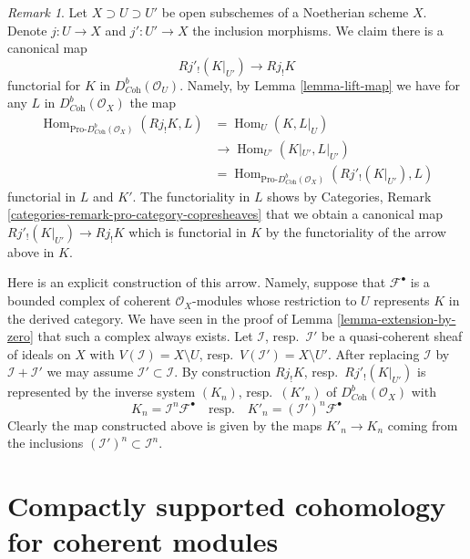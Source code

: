 \documentclass{stacks-project}
\theoremstyle{plain}
\theoremstyle{definition}
\theoremstyle{remark}
\newtheorem{remark}[subsection]{Remark}
\numberwithin{equation}{subsection}
\def\Hom{\mathop{\mathrm{Hom}}\nolimits}
\begin{document}
\begin{remark}
\label{remark-covariance-open-j-lower-shriek}
Let $X \supset U \supset U'$ be open subschemes of a Noetherian scheme $X$.
Denote $j : U \to X$ and $j' : U' \to X$ the inclusion morphisms.
We claim there is a canonical map
$$
Rj'_!(K|_{U'}) \longrightarrow Rj_!K
$$
functorial for $K$ in $D^b_{\textit{Coh}}(\mathcal{O}_U)$. Namely, by
Lemma \ref{lemma-lift-map} we have for any $L$ in
$D^b_{\textit{Coh}}(\mathcal{O}_X)$ the map
\begin{align*}
\Hom_{\text{Pro-}D^b_{\textit{Coh}}(\mathcal{O}_X)}(Rj_!K, L)
& =
\Hom_U(K, L|_U) \\
& \to
\Hom_{U'}(K|_{U'}, L|_{U'}) \\
& =
\Hom_{\text{Pro-}D^b_{\textit{Coh}}(\mathcal{O}_X)}(Rj'_!(K|_{U'}), L)
\end{align*}
functorial in $L$ and $K'$. The functoriality in $L$ shows by
Categories, Remark \ref{categories-remark-pro-category-copresheaves}
that we obtain a canonical map $Rj'_!(K|_{U'}) \to Rj_!K$ which is
functorial in $K$ by the functoriality of the arrow above in $K$.

\medskip\noindent
Here is an explicit construction of this arrow. Namely, suppose
that $\mathcal{F}^\bullet$ is a bounded complex of coherent
$\mathcal{O}_X$-modules whose restriction to $U$ represents $K$
in the derived category. We have seen in the proof of
Lemma \ref{lemma-extension-by-zero}
that such a complex always exists. Let $\mathcal{I}$, resp.\ $\mathcal{I}'$
be a quasi-coherent sheaf of ideals on $X$ with
$V(\mathcal{I}) = X \setminus U$, resp.\ $V(\mathcal{I}') = X \setminus U'$.
After replacing $\mathcal{I}$ by $\mathcal{I} + \mathcal{I}'$
we may assume $\mathcal{I}' \subset \mathcal{I}$.
By construction $Rj_!K$, resp.\ $Rj'_!(K|_{U'})$ is represented by the
inverse system $(K_n)$, resp.\ $(K'_n)$ of $D^b_{\textit{Coh}}(\mathcal{O}_X)$
with
$$
K_n = \mathcal{I}^n\mathcal{F}^\bullet
\quad\text{resp.}\quad
K'_n = (\mathcal{I}')^n\mathcal{F}^\bullet
$$
Clearly the map constructed above is given by the maps
$K'_n \to K_n$ coming from the inclusions
$(\mathcal{I}')^n \subset \mathcal{I}^n$.
\end{remark}






\section{Compactly supported cohomology for coherent modules}
\label{section-compactly-supported}
\end{document}
